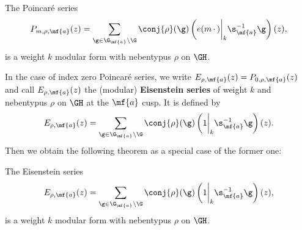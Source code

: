\documentclass[12pt]{article}
\begin{document}
      \begin{theorem}\label{thm:Poincare_series_modular}
        The Poincar\'e series
        \[
          P_{m,\rho,\mf{a}}(z) = \sum_{\g \in \G_{\mf{a}}\backslash\G}\conj{\rho}(\g)\left(e(m\,\cdot\,)\bigg|_{k}\s_{\mf{a}}^{-1}\g\right)(z),
        \]
        is a weight \(k\) modular form with nebentypus \(\rho\) on \(\GH\).
      \end{theorem}

      In the case of index zero Poincar\'e series, we write \(E_{\rho,\mf{a}}(z) = P_{0,\rho,\mf{a}}(z)\) and call \(E_{\rho,\mf{a}}(z)\) the (modular) \textbf{Eisenstein series} of weight \(k\) and nebentypus \(\rho\) on \(\GH\) at the \(\mf{a}\) cusp. It is defined by
      \[
        E_{\rho,\mf{a}}(z) = \sum_{\g \in \G_{\mf{a}}\backslash\G}\conj{\rho}(\g)\left(1\bigg|_{k}\s_{\mf{a}}^{-1}\g\right)(z).
      \]
      Then we obtain the following theorem as a special case of the former one:

      \begin{theorem}\label{thm:Eisenstein_series_modular}
        The Eisenstein series
        \[
          E_{\rho,\mf{a}}(z) = \sum_{\g \in \G_{\mf{a}}\backslash\G}\conj{\rho}(\g)\left(1\bigg|_{k}\s_{\mf{a}}^{-1}\g\right)(z),
        \]
        is a weight \(k\) modular form with nebentypus \(\rho\) on \(\GH\).
      \end{theorem}
\end{document}
